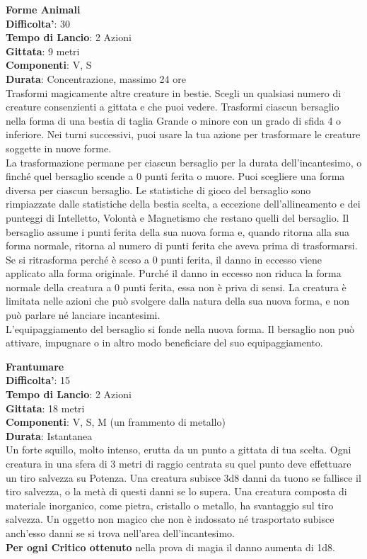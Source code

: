 \begin{multicols}{2}
\medskip\textbf{Forme Animali}\\
\textbf{Difficolta'}: 30\\
\textbf{Tempo di Lancio}: 2 Azioni\\
\textbf{Gittata}: 9 metri\\
\textbf{Componenti}: V, S\\
\textbf{Durata}: Concentrazione, massimo 24 ore\\
Trasformi magicamente altre creature in bestie. Scegli un qualsiasi numero di creature consenzienti a gittata e che puoi vedere. Trasformi ciascun bersaglio nella forma di una bestia di taglia Grande o minore con un grado di sfida 4 o inferiore. Nei turni successivi, puoi usare la tua azione per trasformare le creature soggette in nuove forme.\\
La trasformazione permane per ciascun bersaglio per la durata dell’incantesimo, o finché quel bersaglio scende a 0 punti ferita o muore. Puoi scegliere una forma diversa per ciascun bersaglio. Le  statistiche di gioco del bersaglio sono rimpiazzate dalle statistiche della bestia scelta, a eccezione dell’allineamento e dei punteggi di Intelletto, Volontà e Magnetismo che restano quelli del
bersaglio. Il bersaglio assume i punti ferita della sua nuova forma e, quando ritorna alla sua forma normale, ritorna al numero di punti ferita che aveva prima di trasformarsi. Se si ritrasforma perché è sceso a 0 punti ferita, il danno in eccesso viene applicato alla forma originale. Purché il danno in eccesso non riduca la forma normale della creatura a 0 punti ferita, essa non è priva di sensi. La creatura è limitata nelle azioni che può svolgere dalla natura della sua nuova forma, e non può parlare né lanciare incantesimi.\\
L’equipaggiamento del bersaglio si fonde nella nuova forma. Il bersaglio non può attivare, impugnare o in altro modo beneficiare del suo equipaggiamento.

\medskip\textbf{Frantumare}\\
\textbf{Difficolta'}: 15\\
\textbf{Tempo di Lancio}: 2 Azioni\\
\textbf{Gittata}: 18 metri\\
\textbf{Componenti}: V, S, M (un frammento di metallo)\\
\textbf{Durata}: Istantanea\\
Un forte squillo, molto intenso, erutta da un punto a gittata di tua scelta. Ogni creatura in una sfera di 3 metri di raggio centrata su quel punto deve effettuare un tiro salvezza su Potenza. Una creatura subisce 3d8 danni da tuono se fallisce il tiro salvezza, o la metà di questi danni se lo supera. Una creatura composta di materiale inorganico, come pietra, cristallo o metallo, ha svantaggio sul tiro salvezza. Un oggetto non magico che non è indossato né trasportato subisce anch’esso danni se si trova nell’area dell’incantesimo.\\
\textbf{Per ogni Critico ottenuto} nella prova di magia il danno aumenta di 1d8.


\end{multicols}
